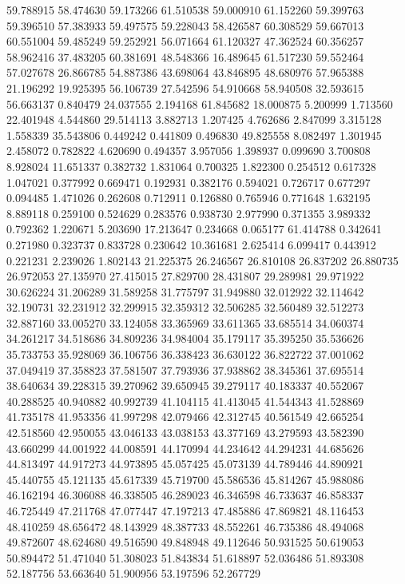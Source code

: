 59.788915
58.474630
59.173266
61.510538
59.000910
61.152260
59.399763
59.396510
57.383933
59.497575
59.228043
58.426587
60.308529
59.667013
60.551004
59.485249
59.252921
56.071664
61.120327
47.362524
60.356257
58.962416
37.483205
60.381691
48.548366
16.489645
61.517230
59.552464
57.027678
26.866785
54.887386
43.698064
43.846895
48.680976
57.965388
21.196292
19.925395
56.106739
27.542596
54.910668
58.940508
32.593615
56.663137
0.840479
24.037555
2.194168
61.845682
18.000875
5.200999
1.713560
22.401948
4.544860
29.514113
3.882713
1.207425
4.762686
2.847099
3.315128
1.558339
35.543806
0.449242
0.441809
0.496830
49.825558
8.082497
1.301945
2.458072
0.782822
4.620690
0.494357
3.957056
1.398937
0.099690
3.700808
8.928024
11.651337
0.382732
1.831064
0.700325
1.822300
0.254512
0.617328
1.047021
0.377992
0.669471
0.192931
0.382176
0.594021
0.726717
0.677297
0.094485
1.471026
0.262608
0.712911
0.126880
0.765946
0.771648
1.632195
8.889118
0.259100
0.524629
0.283576
0.938730
2.977990
0.371355
3.989332
0.792362
1.220671
5.203690
17.213647
0.234668
0.065177
61.414788
0.342641
0.271980
0.323737
0.833728
0.230642
10.361681
2.625414
6.099417
0.443912
0.221231
2.239026
1.802143
21.225375
26.246567
26.810108
26.837202
26.880735
26.972053
27.135970
27.415015
27.829700
28.431807
29.289981
29.971922
30.626224
31.206289
31.589258
31.775797
31.949880
32.012922
32.114642
32.190731
32.231912
32.299915
32.359312
32.506285
32.560489
32.512273
32.887160
33.005270
33.124058
33.365969
33.611365
33.685514
34.060374
34.261217
34.518686
34.809236
34.984004
35.179117
35.395250
35.536626
35.733753
35.928069
36.106756
36.338423
36.630122
36.822722
37.001062
37.049419
37.358823
37.581507
37.793936
37.938862
38.345361
37.695514
38.640634
39.228315
39.270962
39.650945
39.279117
40.183337
40.552067
40.288525
40.940882
40.992739
41.104115
41.413045
41.544343
41.528869
41.735178
41.953356
41.997298
42.079466
42.312745
40.561549
42.665254
42.518560
42.950055
43.046133
43.038153
43.377169
43.279593
43.582390
43.660299
44.001922
44.008591
44.170994
44.234642
44.294231
44.685626
44.813497
44.917273
44.973895
45.057425
45.073139
44.789446
44.890921
45.440755
45.121135
45.617339
45.719700
45.586536
45.814267
45.988086
46.162194
46.306088
46.338505
46.289023
46.346598
46.733637
46.858337
46.725449
47.211768
47.077447
47.197213
47.485886
47.869821
48.116453
48.410259
48.656472
48.143929
48.387733
48.552261
46.735386
48.494068
49.872607
48.624680
49.516590
49.848948
49.112646
50.931525
50.619053
50.894472
51.471040
51.308023
51.843834
51.618897
52.036486
51.893308
52.187756
53.663640
51.900956
53.197596
52.267729
